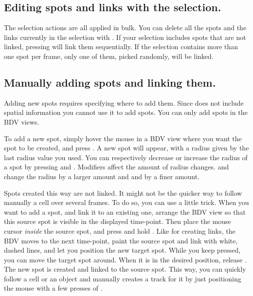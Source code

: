 \subsection{Editing spots and links with the selection.}

The selection actions are all applied in bulk. 
You can delete all the spots and the links currently in the selection with \keys{\shift+\backdel}.
If your selection includes spots that are not linked, pressing  will link them sequentially. 
If the selection contains more than one spot per frame, only one of them, picked randomly, will be linked. 



\subsection{Manually adding spots and linking them.}

Adding new spots requires specifying where to add them.
Since \TrackScheme does not include spatial information you cannot use it to add spots.
You can only add spots in the BDV views. 

To add a new spot, simply hover the mouse in a BDV view where you want the spot to be created, and press .
A new spot will appear, with a radius given by the last radius value you used.
You can respectively decrease or increase the radius of a spot by pressing  and .
Modifiers affect the amount of radius changes.
 and  change the radius by a larger amount and  and  by a finer amount.

Spots created this way are not linked. 
It might not be the quicker way to follow manually a cell over several frames. 
To do so, you can use a little trick. 
When you want to add a spot, and link it to an existing one, arrange the BDV view so that this source spot is visible in the displayed time-point.
Then place the mouse cursor \textit{inside} the source spot, and press and hold .
Like for creating links, the BDV moves to the next time-point, paint the source spot and link with white, dashed lines, and let you position the new target spot.
While you keep  pressed, you can move the target spot around.
When it is in the desired position, release .
The new spot is created and linked to the source spot.
This way, you can quickly follow a cell or an object and manually creates a track for it by just positioning the mouse with a few presses of .

